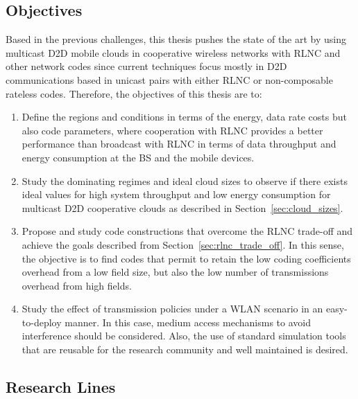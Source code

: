\subsection{Objectives}
\label{sec:objectives}
Based in the previous challenges, this thesis pushes the state of the art by using multicast \ac{D2D} mobile clouds in cooperative wireless networks with \ac{RLNC} and other network codes since current techniques focus mostly in \ac{D2D} communications based in unicast pairs with either \ac{RLNC} or non-composable rateless codes. Therefore, the objectives of this thesis are to:

\begin{enumerate}

\item Define the regions and conditions in terms of the energy, data rate costs but also code parameters, where cooperation with \ac{RLNC} provides a better performance than broadcast with \ac{RLNC} in terms of data throughput and energy consumption at the \ac{BS} and the mobile devices.

\item Study the dominating regimes and ideal cloud sizes to observe if there exists ideal values for high system throughput and low energy consumption for multicast \ac{D2D} cooperative clouds as described in Section~\ref{sec:cloud_sizes}.

\item Propose and study code constructions that overcome the \ac{RLNC} trade-off and achieve the goals described from Section~\ref{sec:rlnc_trade_off}. In this sense, the objective is to find codes that permit to retain the low coding coefficients overhead from a low field size, but also the low number of transmissions overhead from high fields.

\item Study the effect of transmission policies under a \ac{WLAN} scenario in an easy-to-deploy manner. In this case, medium access mechanisms to avoid interference should be considered. Also, the use of standard simulation tools that are reusable for the research community and well maintained is desired.

\end{enumerate}

\subsection{Research Lines}

